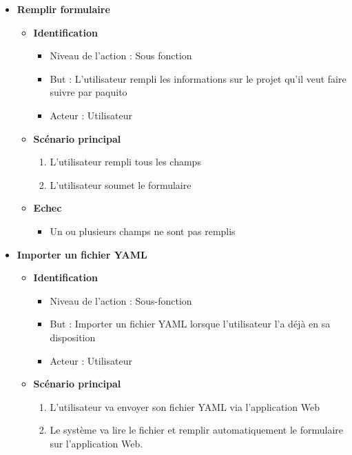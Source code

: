 \documentclass[12pt,a4paper]{article}
\begin{document}
\begin{itemize}
\item\textbf{\large Remplir formulaire}
  \begin{itemize}
  \item \textbf{Identification}
    \begin{itemize}
    \item[] Niveau de l'action : Sous fonction
    \item[] But : L'utilisateur rempli les informations sur le projet qu'il veut faire suivre par paquito
    \item[] Acteur : Utilisateur
    \end{itemize}
  \item \textbf{Scénario principal}
    \begin{enumerate}
    \item L'utilisateur rempli tous les champs
    \item L'utilisateur soumet le formulaire
    \end{enumerate}
  \item \textbf{Echec}
    \begin{itemize}
    \item Un ou plusieurs champs ne sont pas remplis
    \end{itemize}
  \end{itemize}

\item\textbf{\large Importer un fichier YAML}
  \begin{itemize}
  \item \textbf{Identification}
    \begin{itemize}
    \item[] Niveau de l'action : Sous-fonction
    \item[] But : Importer un fichier YAML lorsque l'utilisateur l'a déjà en sa disposition
    \item[] Acteur : Utilisateur
    \end{itemize}
  \item \textbf{Scénario principal}
    \begin{enumerate}
    \item L'utilisateur va envoyer son fichier YAML via l'application Web
    \item Le système va lire le fichier et remplir automatiquement le formulaire sur l'application Web.
    \end{enumerate}
  \end{itemize}
  

\end{itemize}
\end{document}
